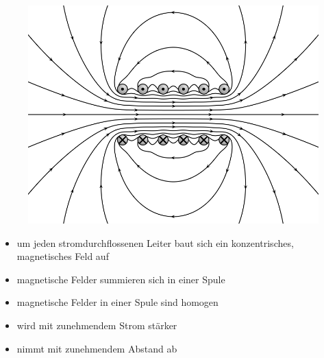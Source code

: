 \begin{frame}
\begin{center}
\begin{minipage}{0.45\textwidth}
\begin{center}
\begin{figure}
          \includegraphics[width=\textwidth,height=.3\textheight,keepaspectratio]{e08/VFPt_cylindrical_coil_real.png}\\
        \end{figure}
            \end{center}
        \end{minipage}
       
        \bigskip

        \begin{itemize}
            \item um jeden stromdurchflossenen Leiter baut sich ein konzentrisches, magnetisches Feld auf
            \item magnetische Felder summieren sich in einer Spule
            \item magnetische Felder in einer Spule sind homogen
            \item wird mit zunehmendem Strom stärker
            \item nimmt mit zunehmendem Abstand ab
        \end{itemize}

    \end{center}
\end{frame}

